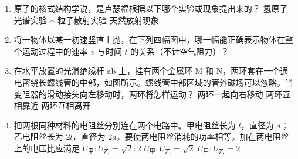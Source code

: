 \documentclass[\gkver]{gaokaozhenti}
\begin{document}
\begin{enumerate}

\item
原子的核式结构学说，是卢瑟福根据以下哪个实验或现象提出来的？
{氢原子光谱实验}
{$\alpha$ 粒子散射实验}
{天然放射现象}


\item
将一物体以某一初速竖直上抛，在下列四幅图中，哪一幅能正确表示物体在整个运动过程中的速率 $v$ 与时间 $t$ 的关系（不计空气阻力）？
\fourchoices[answer=B, ispicture=true, wA=2.98cm, wB=2.98cm, wC=2.93cm, wD=2.95cm]
{}
{}
{}
{}


\item
在水平放置的光滑绝缘杆 ab 上，挂有两个金属环 M 和 N，两环套在一个通电密绕长螺线管的中部，如图所示。螺线管中部区域的管外磁场可以忽略。当变阻器的滑动接头向左移动时，两环将怎样运动？
\onepicture[w=5.27cm]{}
{两环一起向右移动}
{两环互相靠近}
{两环互相离开}


\item
把两根同种材料的电阻丝分别连在两个电路中。甲电阻丝长为 $l$，直径为 $d$；乙电阻丝长为 $2l$，直径为 $2d$。要使两电阻丝消耗的功率相等。加在两电阻丝上的电压比应满足
{$U_{\text{甲}}:U_{\text{乙}}=\sqrt{2}:2$}
{$U_{\text{甲}}:U_{\text{乙}}=\sqrt{2}$}
{$U_{\text{甲}}:U_{\text{乙}}=2$}


\end{enumerate}
\end{document}
